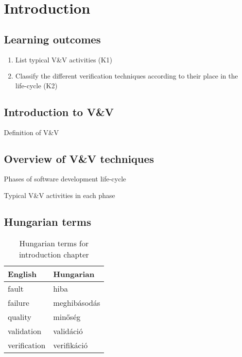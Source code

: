 \chapter{Introduction}
\label{cha:introduction}


\section*{Learning outcomes}

\begin{enumerate}
    \item List typical V\&V activities (K1)
    \item Classify the different verification techniques according to their place in the life-cycle (K2)
\end{enumerate}


\section{Introduction to V\&V}

Definition of V\&V


\section{Overview of V\&V techniques}

Phases of software development life-cycle

Typical V\&V activities in each phase


\section{Hungarian terms}

\begin{table}[ht]
    \centering
    \small
    \caption{Hungarian terms for introduction chapter}
    \begin{tabular}{ll}
        \toprule
        \textbf{English} & \textbf{Hungarian} \\
        \midrule
        fault & hiba \\
        failure & meghibásodás \\
        quality & minőség \\
        validation & validáció \\
        verification & verifikáció \\
        \bottomrule
    \end{tabular}
    \label{tab:overview:hungarian-terms-overview}
\end{table} 